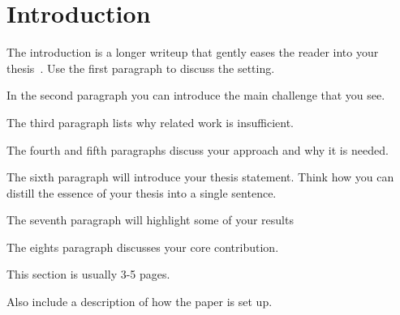 
\chapter{Introduction}


The introduction is a longer writeup that gently eases the reader into your
thesis~\cite{dinesh20oakland}. Use the first paragraph to discuss the setting.

In the second paragraph you can introduce the main challenge that you see.

The third paragraph lists why related work is insufficient.

The fourth and fifth paragraphs discuss your approach and why it is needed.

The sixth paragraph will introduce your thesis statement. Think how you can
distill the essence of your thesis into a single sentence.

The seventh paragraph will highlight some of your results

The eights paragraph discusses your core contribution.

This section is usually 3-5 pages.

Also include a description of how the paper is set up.